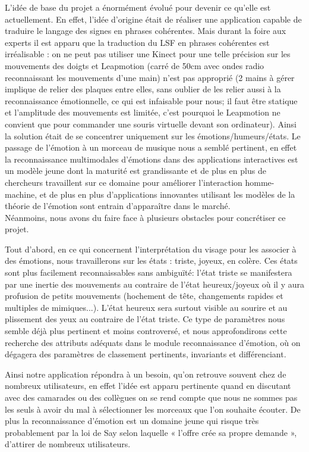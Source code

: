 L’idée de base du projet a énormément évolué pour devenir ce qu’elle est actuellement.
En effet, l’idée d’origine était de réaliser une application capable de traduire le langage des signes en phrases cohérentes.
Mais durant la foire aux experts il est apparu que la traduction du LSF en phrases cohérentes est irréalisable : on ne peut pas utiliser une Kinect pour une telle précision sur les mouvements des doigts et Leapmotion (carré de 50cm avec ondes radio reconnaissant les mouvements d’une main) n’est pas approprié (2 mains à gérer implique de relier des plaques entre elles, sans oublier de les relier aussi à la reconnaissance émotionnelle, ce qui est infaisable pour nous; il faut être statique et l’amplitude des mouvements est limitée, c’est pourquoi le Leapmotion ne convient que pour commander une souris virtuelle devant son ordinateur).
Ainsi la solution était de se concentrer uniquement sur les émotions/humeurs/états.
Le passage de l’émotion à un morceau de musique nous a semblé pertinent, en effet la reconnaissance multimodales d’émotions dans des applications interactives est un modèle jeune dont la maturité est grandissante et de plus en plus de chercheurs travaillent sur ce domaine pour améliorer l’interaction homme-machine, et de plus en plus d’applications innovantes utilisant les modèles de la théorie de l’émotion sont entrain d’apparaître dans le marché.\\

Néanmoins, nous avons du faire face à plusieurs obstacles pour concrétiser ce projet.

Tout d’abord, en ce qui concernent l’interprétation du visage pour les associer à des émotions, nous travaillerons sur les états : triste, joyeux, en colère.
Ces états sont plus facilement reconnaissables sans ambiguïté: l'état triste se manifestera par une inertie des mouvements au contraire de l'état heureux/joyeux où il y aura profusion de petits mouvements (hochement de tête, changements rapides et multiples de mimiques...).
L'état heureux sera surtout visible au sourire et au plissement des yeux au contraire de l'état triste.
Ce type de paramètres nous semble déjà plus pertinent et moins controversé, et nous approfondirons cette recherche des attributs adéquats dans le module reconnaissance d’émotion, où on dégagera des paramètres de classement pertinents, invariants et différenciant.

Ainsi notre application répondra à un besoin, qu’on retrouve souvent chez de nombreux utilisateurs, en effet l’idée est apparu pertinente quand en discutant avec des camarades ou des collègues on se rend compte que nous ne sommes pas les seuls à avoir du mal à sélectionner les morceaux que l’on souhaite écouter.
De plus la reconnaissance d’émotion est un domaine jeune qui risque très probablement par la loi de Say selon laquelle « l’offre crée sa propre demande », d’attirer de nombreux utilisateurs.

